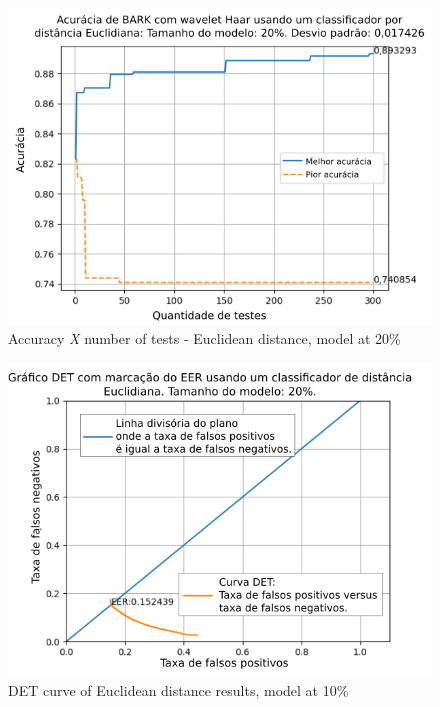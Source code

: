 			
			
			\begin{figure}[ht]
				\centering
				\includegraphics[width=\linewidth]{images/results/confusionMatrices/classifier_Euclidian_20}
				\caption{Accuracy \textit {X} number of tests - Euclidean distance, model at 20\%}
				\label{fig:classifiereuclidian20}
			\end{figure}
			
			\begin{figure}[!ht]
				\centering
				\includegraphics[width=.9\linewidth]{images/results/det/DET_for_classifier_Euclidian_20}
				\caption{DET curve of Euclidean distance results, model at 10\%}
				\label{fig:detforclassifiereuclidian20}
			\end{figure}
		
